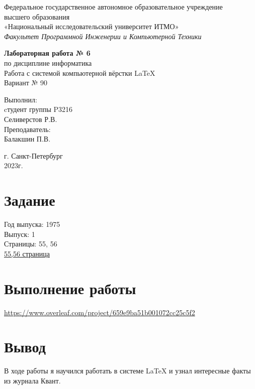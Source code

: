 \thispagestyle{empty}
\begin{center}
    Федеральное государственное автономное образовательное учреждение\\ 
    высшего образования\\
    «Национальный исследовательский университет ИТМО»\\
    \textit{Факультет Программной Инженерии и Компьютерной Техники}\\
\end{center}
\vspace{2cm}
\begin{center}
    \large
    \textbf{Лабораторная работа № 6}\\
    по дисциплине информатика\\
    Работа с системой компьютерной вёрстки \LaTeX \\
    Вариант № 90
\end{center}
\vspace{7cm}
\begin{flushright}
    Выполнил:\\
    cтудент  группы P3216\\
    Селиверстов Р.В.\\
    Преподаватель: \\
    Балакшин П.В.\\
\end{flushright}
\vspace{6cm}
\begin{center}
    г. Санкт-Петербург\\
    2023г.
\end{center}
\newpage

\tableofcontents

\newpage

\section{Задание}
Год выпуска: 1975\\
Выпуск: 1\\
Страницы: 55, 56\\

\href{https://kvant.ras.ru/1978/10/kogda_sushchestvuet_predel.htm}{55,56 страница}

\newpage

\section{Выполнение работы}
\url{https://www.overleaf.com/project/659e9ba51b001072cc25c5f2}
\newpage

\section{Вывод}
В ходе работы я научился работать в системе \LaTeX{} и узнал интересные факты из журнала Квант.